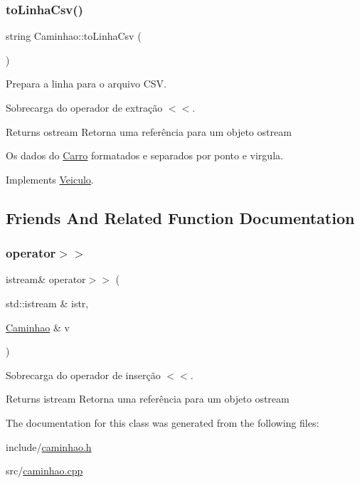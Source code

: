 \subsubsection{\texorpdfstring{to\+Linha\+Csv()}{toLinhaCsv()}}
{\footnotesize\ttfamily string Caminhao\+::to\+Linha\+Csv (\begin{DoxyParamCaption}{ }\end{DoxyParamCaption})\hspace{0.3cm}{\ttfamily [virtual]}}



Prepara a linha para o arquivo C\+SV. 

Sobrecarga do operador de extração $<$$<$. \begin{DoxyReturn}{Returns}
ostream Retorna uma referência para um objeto ostream

Os dados do \hyperlink{classCarro}{Carro} formatados e separados por ponto e virgula. 
\end{DoxyReturn}


Implements \hyperlink{classVeiculo}{Veiculo}.



\subsection{Friends And Related Function Documentation}
\mbox{\label{classCaminhao_a8b4c2cf9aa77fc48a4c2b68bd052b512}} 
\subsubsection{\texorpdfstring{operator$>$$>$}{operator>>}}
{\footnotesize\ttfamily istream\& operator$>$$>$ (\begin{DoxyParamCaption}\item[{std\+::istream \&}]{istr,  }\item[{\hyperlink{classCaminhao}{Caminhao} \&}]{v }\end{DoxyParamCaption})\hspace{0.3cm}{\ttfamily [friend]}}

Sobrecarga do operador de inserção $<$$<$. \begin{DoxyReturn}{Returns}
istream Retorna uma referência para um objeto ostream 
\end{DoxyReturn}


The documentation for this class was generated from the following files\+:\begin{DoxyCompactItemize}
\item 
include/\hyperlink{caminhao_8h}{caminhao.\+h}\item 
src/\hyperlink{caminhao_8cpp}{caminhao.\+cpp}\end{DoxyCompactItemize}
